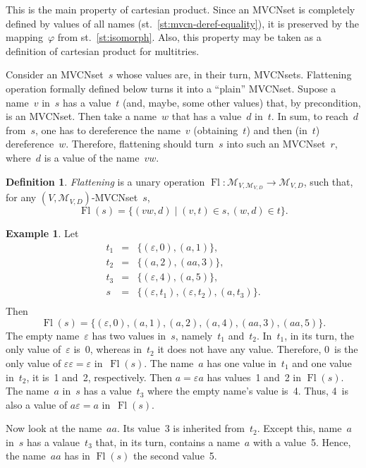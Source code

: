 \documentclass{article}
\theoremstyle{definition}
\newtheorem{Df}{Definition}
\newtheorem{Ex}{Example}
\newcommand{\setcharmvcn}{M}
\newcommand{\setsymbol}[3]{\mathcal{#1}_{#2,#3}}
\newcommand{\setmvcn}[2]{\setsymbol{\setcharmvcn}{#1}{#2}}
\newcommand{\flatten}{\operatorname{Fl}}
\begin{document}
This is the main property of cartesian product. Since an MVCNset is
completely defined by values of all names (st.~\ref{st:mvcn-deref-equality}),
it is preserved by the mapping~$\varphi$ from st.~\ref{st:isomorph}. Also, this
property may be taken as a definition of cartesian product for multitries.

Consider an MVCNset~$s$ whose values are, in their turn, MVCNsets.  Flattening
operation formally defined below turns it into a ``plain'' MVCNset.  Supose a
name~$v$ in~$s$ has a value~$t$ (and, maybe, some other values) that, by
precondition, is an MVCNset.  Then take a name~$w$ that has a value~$d$ in~$t$.
In sum, to reach~$d$ from~$s$, one has to dereference the name~$v$
(obtaining~$t$) and then (in~$t$) dereference~$w$. Therefore, flattening should
turn~$s$ into such an MVCNset~$r$, where~$d$ is a value of the name~$vw$.

\begin{Df}\label{df:flatten}
\emph{Flattening} is a unary operation
$\flatten : \setmvcn{V}{\setmvcn{V}{D}} \to\setmvcn{V}{D}$,
such that, for any $(V,\setmvcn{V}{D})$-MVCNset~$s$,
\[
  \flatten(s) = \{ (vw, d) \mid (v, t) \in s, (w, d) \in t \} .
\]
\end{Df}

\begin{Ex}\label{ex:flatten}
Let
\begin{eqnarray*}
  t_1 & = & \{ (\varepsilon, 0), (a, 1) \} ,\\
  t_2 & = & \{ (a, 2), (aa, 3) \} ,\\
  t_3 & = & \{ (\varepsilon, 4), (a, 5) \} ,\\
  s   & = & \{ (\varepsilon, t_1), (\varepsilon, t_2), (a, t_3) \} .\\
\end{eqnarray*}
Then
\[
  \flatten(s) = \{
      (\varepsilon, 0), (a, 1), (a, 2), (a, 4), (aa, 3), (aa, 5)
  \} .
\]
The empty name~$\varepsilon$ has two values in~$s$, namely~$t_1$ and~$t_2$.
In~$t_1$, in its turn, the only value of~$\varepsilon$ is~0, whereas in~$t_2$
it does not have any value. Therefore, 0~is the only value of $\varepsilon
\varepsilon = \varepsilon$ in~$\flatten(s)$.  The name~$a$ has one value in~$t_1$
and one value in~$t_2$, it is~1 and~2, respectively.  Then $a = \varepsilon a$
has values~1 and~2 in $\flatten(s)$.  The name~$a$ in~$s$ has a value~$t_3$
where the empty name's value is~4. Thus, 4~is also a value of $a \varepsilon =
a$ in~$\flatten(s)$.

Now look at the name~$aa$. Its value~3 is inherited from~$t_2$. Except this,
name~$a$ in~$s$ has a valaue~$t_3$ that, in its turn, contains a name~$a$ with
a value~5. Hence, the name~$aa$ has in $\flatten(s)$ the second value~5.
\end{Ex}
\end{document}
